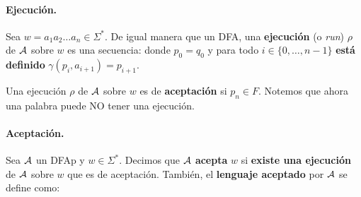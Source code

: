 \paragraph{Ejecución.} Sea $w = a_1 a_2 \ldots a_n \in \Sigma^*$. De igual manera que un DFA, una \textbf{ejecución} (o \textit{run}) $\rho$ de $\mathcal{A}$ sobre $w$ es una secuencia:
donde $p_0 = q_0$ y para todo $i \in \{0,\ldots,n-1\}$ \textbf{está definido} $\gamma(p_i, a_{i+1}) = p_{i+1}$. \medbreak

Una ejecución $\rho$ de $\mathcal{A}$ sobre $w$ es de \textbf{aceptación} si $p_n \in F$. Notemos que ahora una palabra puede NO tener una ejecución.

\paragraph{Aceptación.} Sea $\mathcal{A}$ un DFAp y $w \in \Sigma^*$. Decimos que $\mathcal{A}$ \textbf{acepta} $w$ si \textbf{existe una ejecución} de $\mathcal{A}$ sobre $w$ que es de aceptación. También, el \textbf{lenguaje aceptado} por $\mathcal{A}$ se define como:



